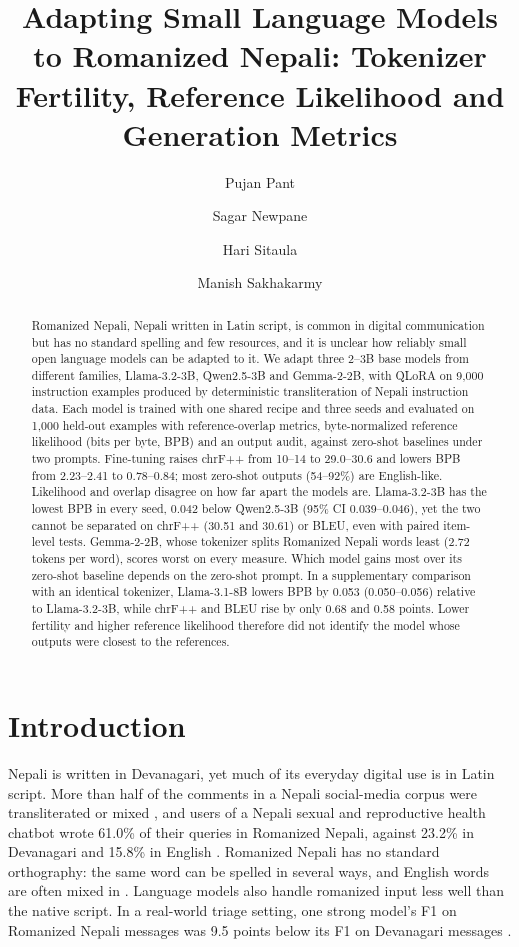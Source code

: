 \documentclass{article}
\title{Adapting Small Language Models to Romanized Nepali: Tokenizer Fertility, Reference Likelihood and Generation Metrics}
\author[1,*]{Pujan Pant}
\author[1]{Sagar Newpane}
\author[2]{Hari Sitaula}
\author[3,*]{Manish Sakhakarmy}
\affil[1]{Herald College Kathmandu, University of Wolverhampton, Naxal, Kathmandu 44600, Nepal}
\affil[2]{Department of Mathematical Sciences, Montana Technological University, Butte, MT 59701, USA}
\affil[3]{ASI Industrial, Billings, MT 59101, USA}
\affil[*]{Correspondence: \texttt{pantpujan017@gmail.com} (P.P.); \texttt{sakhakarmym@gmail.com} (M.S.)}
\date{}
\begin{document}
\maketitle

\begin{abstract}
Romanized Nepali, Nepali written in Latin script, is common in digital communication but has no standard spelling and few resources, and it is unclear how reliably small open language models can be adapted to it. We adapt three 2–3B base models from different families, Llama-3.2-3B, Qwen2.5-3B and Gemma-2-2B, with QLoRA on 9,000 instruction examples produced by deterministic transliteration of Nepali instruction data. Each model is trained with one shared recipe and three seeds and evaluated on 1,000 held-out examples with reference-overlap metrics, byte-normalized reference likelihood (bits per byte, BPB) and an output audit, against zero-shot baselines under two prompts. Fine-tuning raises chrF++ from 10–14 to 29.0–30.6 and lowers BPB from 2.23–2.41 to 0.78–0.84; most zero-shot outputs (54–92\%) are English-like. Likelihood and overlap disagree on how far apart the models are. Llama-3.2-3B has the lowest BPB in every seed, 0.042 below Qwen2.5-3B (95\% CI 0.039–0.046), yet the two cannot be separated on chrF++ (30.51 and 30.61) or BLEU, even with paired item-level tests. Gemma-2-2B, whose tokenizer splits Romanized Nepali words least (2.72 tokens per word), scores worst on every measure. Which model gains most over its zero-shot baseline depends on the zero-shot prompt. In a supplementary comparison with an identical tokenizer, Llama-3.1-8B lowers BPB by 0.053 (0.050–0.056) relative to Llama-3.2-3B, while chrF++ and BLEU rise by only 0.68 and 0.58 points. Lower fertility and higher reference likelihood therefore did not identify the model whose outputs were closest to the references.
\end{abstract}


\section{Introduction}\label{sec:intro}

Nepali is written in Devanagari, yet much of its everyday digital use is in Latin script. More than half of the comments in a Nepali social-media corpus were transliterated or mixed \citep{niraula2021}, and users of a Nepali sexual and reproductive health chatbot wrote 61.0\% of their queries in Romanized Nepali, against 23.2\% in Devanagari and 15.8\% in English \citep[Fig. 4A]{sharma2026}. Romanized Nepali has no standard orthography: the same word can be spelled in several ways, and English words are often mixed in \citep{chaudhary2025}. Language models also handle romanized input less well than the native script. In a real-world triage setting, one strong model's F1 on Romanized Nepali messages was 9.5 points below its F1 on Devanagari messages \citep{khullar2025}.
\end{document}
